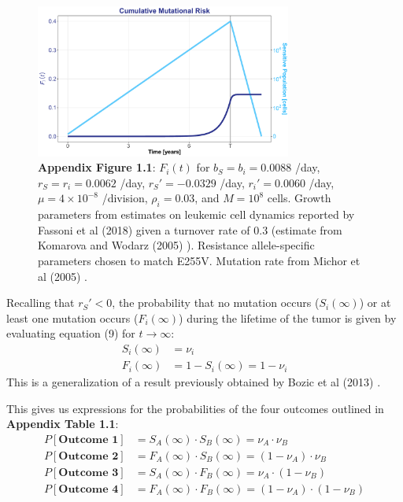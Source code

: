 \documentclass{article}
\begin{document}
\begin{figure}
\includegraphics[width=0.75\textwidth]{CumMutRisk}
\centering
\\
\textbf{Appendix Figure 1.1}: $F_i(t)$ for $b_S = b_i = 0.0088$ /day, $r_S = r_i = 0.0062$ /day, $r_S' = -0.0329$ /day, $r_i' = 0.0060$ /day, $\mu = 4\times10^{-8}$ /division, $\rho_i = 0.03$, and $M = 10^8$ cells. Growth parameters from estimates on leukemic cell dynamics reported by Fassoni et al (2018) \cite{2} given a turnover rate of 0.3 (estimate from Komarova and Wodarz (2005) \cite{3}). Resistance allele-specific parameters chosen to match E255V. Mutation rate from Michor et al (2005) \cite{4}.
\end{figure}

\FloatBarrier

Recalling that $r_S'<0$, the probability that no mutation occurs ($S_i(\infty)$) or at least one mutation occurs ($F_i(\infty)$) during the lifetime of the tumor is given by evaluating equation (9) for $t \xrightarrow{} \infty$:
\begin{equation}
\begin{split}
S_i(\infty) &= \nu_i \\
F_i(\infty) &= 1-S_i(\infty) = 1- \nu_i
\end{split}
\end{equation}
This is a generalization of a result previously obtained by Bozic et al (2013) \cite{5}.

This gives us expressions for the probabilities of the four outcomes outlined in \textbf{Appendix Table 1.1}:
\begin{equation}
\begin{split}
P[\textbf{Outcome 1}] &= S_A(\infty)\cdot S_B(\infty) = \nu_A \cdot \nu_B \\
P[\textbf{Outcome 2}] &= F_A(\infty)\cdot S_B(\infty) = (1-\nu_A) \cdot \nu_B \\
P[\textbf{Outcome 3}] &= S_A(\infty)\cdot F_B(\infty) = \nu_A \cdot (1-\nu_B) \\
P[\textbf{Outcome 4}] &= F_A(\infty)\cdot F_B(\infty) = (1-\nu_A) \cdot (1 - \nu_B)
\end{split}
\end{equation}
\end{document}
